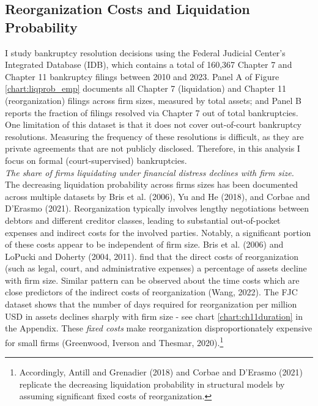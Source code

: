 \documentclass[12pt]{article}
\begin{document}
\subsection{Reorganization Costs and Liquidation Probability \label{sec:emp liqprob}} 

I study bankruptcy resolution decisions using the Federal Judicial Center's Integrated Database (IDB), which contains a total of 160,367 Chapter 7 and Chapter 11 bankruptcy filings between 2010 and 2023. Panel A of Figure \ref{chart:liqprob_emp} documents all Chapter 7 (liquidation) and Chapter 11 (reorganization) filings across firm sizes, measured by total assets; and Panel B reports the fraction of filings resolved via Chapter 7 out of total bankruptcies. One limitation of this dataset is that it does not cover out-of-court bankruptcy resolutions. Measuring the frequency of these resolutions is difficult, as they are private agreements that are not publicly disclosed. Therefore, in this analysis I focus on formal (court-supervised) bankruptcies.  \vspace{3mm} \\
\textit{The share of firms liquidating under financial distress declines with firm size.} \vspace{2mm} \\ 
The decreasing liquidation probability across firms sizes has been documented across multiple datasets by Bris et al. (2006), Yu and He (2018), and Corbae and D’Erasmo (2021). Reorganization typically involves lengthy negotiations between debtors and different creditor classes, leading to substantial out-of-pocket expenses and indirect costs for the involved parties. Notably, a significant portion of these costs appear to be independent of firm size. Bris et al. (2006) and LoPucki and Doherty (2004, 2011). find that the direct costs of reorganization (such as legal, court, and administrative expenses) a percentage of assets decline with firm size. Similar pattern can be observed about the time costs which are close predictors of the indirect costs of reorganization (Wang, 2022). The FJC dataset shows that the number of days required for reorganization per million USD in assets declines sharply with firm size - see chart \ref{chart:ch11duration} in the Appendix. These \textit{fixed costs} make reorganization disproportionately expensive for small firms (Greenwood, Iverson and Thesmar, 2020).\footnote{Accordingly, Antill and Grenadier (2018) and Corbae and D'Erasmo (2021) replicate the decreasing liquidation probability in structural models by assuming significant fixed costs of reorganization.} 
\end{document}
